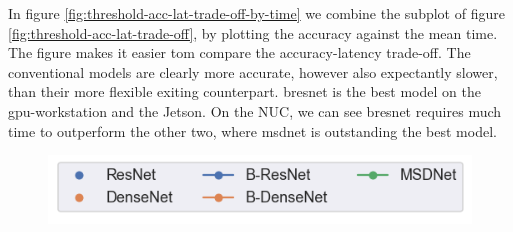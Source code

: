 In figure \ref{fig:threshold-acc-lat-trade-off-by-time} we combine the subplot of figure \ref{fig:threshold-acc-lat-trade-off}, by plotting the accuracy against the mean time. The figure makes it easier tom compare the accuracy-latency trade-off. The conventional models are clearly more accurate, however also expectantly slower, than their more flexible exiting counterpart. \gls{bresnet} is the best model on the \gls{gpu}-workstation and the Jetson. On the NUC, we can see \gls{bresnet} requires much time to outperform the other two, where \gls{msdnet} is outstanding the best model. 

\begin{figure}
	\captionsetup[subfigure]{justification=centering,farskip=0pt,captionskip=0pt}
	\centering
	\includegraphics[width=.4\linewidth]{figures/threshold_plots/inference_by_time_legend}
	\hfill
	\hfill

\end{figure}
